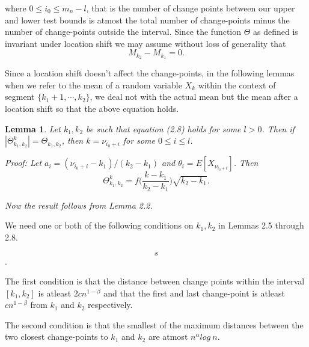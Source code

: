 \documentclass[a4paper, 12pt, notitlepage]{report}
\newtheorem{lemma}[theorem]{Lemma}
\begin{document}
where \(0 \leq i_0 \leq m_n - l\), that is the number of change points between our upper and lower test bounds is atmost the total number of change-points minus the number of change-points outside the interval. Since the function \(\Theta\) as defined %
is invariant under location shift we may assume without loss of generality that
\[M_{k_2} - M_{k_1} = 0.\]

Since a location shift doesn't affect the change-points, in the following lemmas when we refer to the mean of a random variable \(X_k\) within the context of segment \( \{ k_1 +1, \cdots, k_2 \} \), we deal not with the actual mean but the mean after a location shift so that the above equation holds.

\begin{lemma}
%
Let \( k_1, k_2 \) be such that equation (2.8) holds for some \(l > 0\). Then if \(|\Theta^k_{k_1,k_2}| = \Theta_{k_1,k_2}\), then \( k = \nu_{i_0+i}\) for some \(0 \leq i \leq l\).

Proof:\newline
Let \(a_i = (\nu_{i_0+i} - k_1)/(k_2 - k_1)\) and \(\theta_i = E[X_{\nu_{i_0+i}}]\). Then
\[ \Theta^k_{k_1,k_2} = f \Bigg(\frac{k - k_1}{k_2 - k_1}\Bigg ) \sqrt{k_2 - k_1}.\]

Now the result follows from Lemma 2.2.
\end{lemma}
%


We need one or both of the following conditions on \(k_1, k_2\) in Lemmas 2.5 through 2.8.

\[s\].

The first condition is that the distance between change points within the interval \( [k_1, k_2]\) is atleast \(2cn^{1-\beta}\) and that the first and last change-point is atleast \(cn^{1-\beta} \) from \( k_1 \) and \( k_2 \) respectively.

The second condition is that the smallest of the maximum distances between the two closest change-points to \(k_1\) and \(k_2\) are atmost \(n^\alpha log \ n\).
\end{document}
